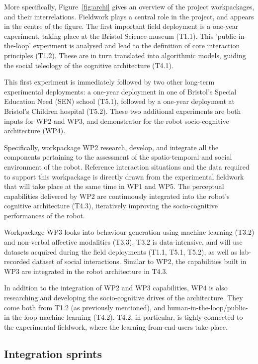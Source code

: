 \documentclass[11pt,a4paper]{report}
\begin{document}
More specifically, Figure~\ref{fig:archi} gives an overview of the project
workpackages, and their interrelations. Fieldwork plays a central role in the
project, and appears in the centre of the figure. The first important field
deployment is a one-year experiment, taking place at the Bristol Science museum
(T1.1). This 'public-in-the-loop' experiment is analysed and lead to the
definition of core interaction principles (T1.2). These are in turn translated
into algorithmic models, guiding the social teleology of the cognitive
architecture (T4.1).

This first experiment is immediately followed by two other long-term
experimental deployments: a one-year deployment in one of Bristol's Special
Education Need (SEN) school (T5.1), followed by a one-year deployment at
Bristol's Children hospital (T5.2). These two additional experiments are both
inputs for WP2 and WP3, and demonstrator for the robot socio-cognitive
architecture (WP4).

Specifically, workpackage WP2 research, develop, and integrate all the components
pertaining to the assessment of the spatio-temporal and social environment of
the robot. Reference interaction situations and the data required to support
this workpackage is directly drawn from the experimental fieldwork that will
take place at the same time in WP1 and WP5. The perceptual capabilities
delivered by WP2 are continuously integrated into the robot's cognitive
architecture (T4.3), iteratively improving the socio-cognitive performances of
the robot.

Workpackage WP3 looks into behaviour generation using machine learning (T3.2)
and non-verbal affective modalities (T3.3). T3.2 is data-intensive, and will use
datasets acquired during the field deployments (T1.1, T5.1, T5.2), as well as
lab-recorded dataset of social interactions. Similar to WP2, the capabilities
built in WP3 are integrated in the robot architecture in T4.3.

In addition to the integration of WP2 and WP3 capabilities, WP4 is also
researching and developing the socio-cognitive drives of the architecture. They
come both from T1.2 (as previously mentioned), and
human-in-the-loop/public-in-the-loop machine learning (T4.2). T4.2, in
particular, is tighly connected to the experimental fieldwork, where the
learning-from-end-users take place.

\subsection{Integration sprints}
\end{document}
